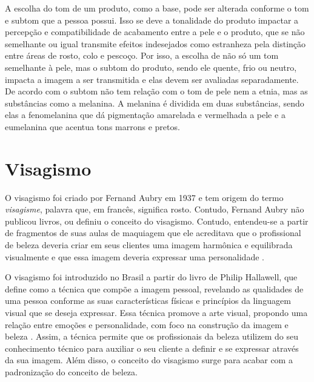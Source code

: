 A escolha do tom de um produto, como a base, pode ser alterada conforme o tom e subtom que a pessoa possui. Isso se deve a tonalidade do produto impactar a percepção e compatibilidade de acabamento entre a pele e o produto, que se não semelhante ou igual transmite efeitos indesejados como estranheza pela distinção entre áreas de rosto, colo e pescoço. Por isso, a escolha de não só um tom semelhante à pele, mas o subtom do produto, sendo ele quente, frio ou neutro, impacta a imagem a ser transmitida e elas devem ser avaliadas separadamente. De acordo com \cite{Maquiagem_técnicas_referências_e_atuação_profissional}  o  subtom  não tem relação com o tom de pele nem a etnia, mas as substâncias como a melanina. A melanina é dividida em duas substâncias, sendo elas a fenomelanina que dá pigmentação amarelada e vermelhada a pele e a eumelanina que acentua tons marrons e pretos.

\section{Visagismo}
O visagismo foi criado por Fernand Aubry em 1937 e tem origem do termo \textit{visagisme}, palavra que, em francês, significa rosto. Contudo, Fernand Aubry não publicou livros, ou definiu o conceito do visagismo. Contudo, entendeu-se a partir de fragmentos de suas aulas de maquiagem que ele acreditava que o profissional de beleza deveria criar em seus clientes uma imagem harmônica e equilibrada visualmente e que essa imagem deveria expressar uma personalidade \cite{Visagismo_Harmonia_e_Estetica}.

O visagismo foi introduzido no Brasil a partir do livro de Philip Hallawell, que define como a técnica que compõe a imagem pessoal, revelando as qualidades de uma pessoa conforme as suas características físicas e princípios da linguagem visual que se deseja expressar. Essa técnica promove a arte visual, propondo uma relação entre emoções e personalidade, com foco na construção da imagem e beleza \cite{Visagismo_Harmonia_e_Estetica}. Assim, a técnica permite que os profissionais da beleza utilizem do seu conhecimento técnico para auxiliar o seu cliente a definir e se expressar através da sua imagem. Além disso, o conceito do visagismo surge para acabar com a padronização do conceito de beleza\cite{Visagismo}. 

